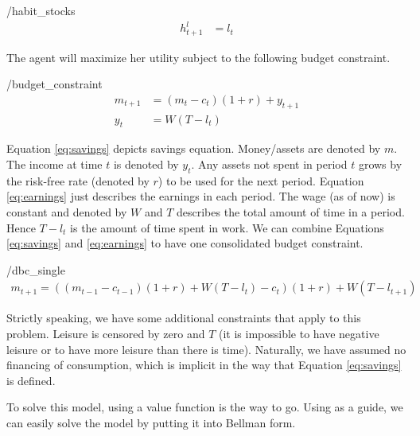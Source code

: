 \documentclass[ProjectMMD]{subfiles}
\begin{document}
\hypertarget{habit_stocks}{}
\begin{verbatimwrite}{\EqDir/habit_stocks}
	\begin{align}
		h_{t+1}^l & = l_t \label{eq:habit}	
	\end{align}
\end{verbatimwrite}


The agent will maximize her utility subject to the following budget constraint.
\hypertarget{budget_constraint}{}
\begin{verbatimwrite}{\EqDir/budget_constraint}
  \begin{align}
    m_{t+1} & = (m_t -c_t)(1+r) + y_{t+1} \label{eq:savings} \\
    y_t &= W(T-l_t) \label{eq:earnings}
  \end{align}
\end{verbatimwrite}


Equation \eqref{eq:savings} depicts savings equation. Money/assets are denoted by $m$. The income at time $t$ is denoted by $y_t$. Any assets not spent in period $t$ grows by the risk-free rate (denoted by $r$) to be used for the next period. Equation \eqref{eq:earnings} just describes the earnings in each period. The wage (as of now) is constant and denoted by $W$ and $T$ describes the total amount of time in a period. Hence $T-l_t$ is the amount of time spent in work. We can combine Equations \eqref{eq:savings} and \eqref{eq:earnings} to have one consolidated budget constraint.
\hypertarget{dbc_single}{}
\begin{verbatimwrite}{\EqDir/dbc_single}
  \begin{align}
    m_{t+1} = ((m_{t-1}-c_{t-1})(1+r) +W(T-l_t) - c_t ) (1+r) + W(T-l_{t+1}) \label{eq:dbc}
  \end{align}
\end{verbatimwrite}


Strictly speaking, we have some additional constraints that apply to this problem. Leisure is censored by zero and $T$ (it is impossible to have negative leisure or to have more leisure than there is time). Naturally, we have assumed no financing of consumption, which is implicit in the way that Equation \eqref{eq:savings} is defined. 

To solve this model, using a value function is the way to go. Using \cite{carroll:solvinghabits} as a guide, we can easily solve the model by putting it into Bellman form.
\end{document}
